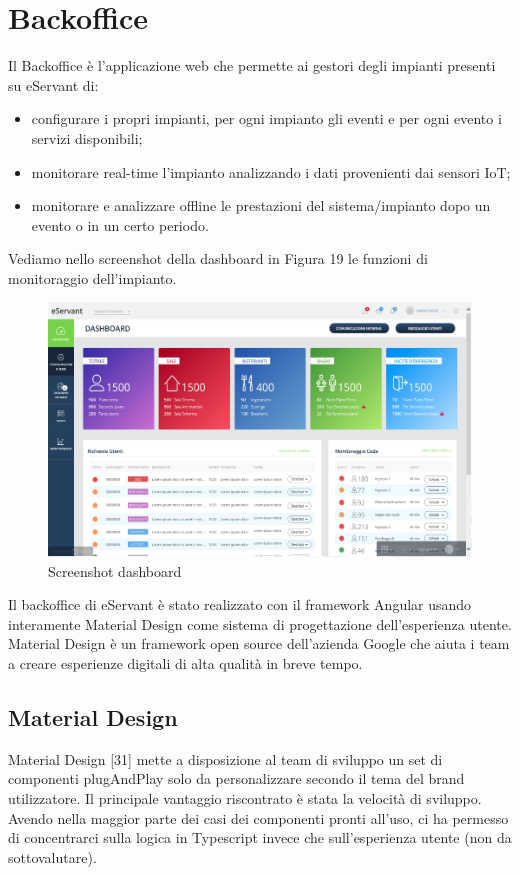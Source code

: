 \chapter{Backoffice}
Il Backoffice è l'applicazione web che permette ai gestori degli impianti presenti su eServant di:
\begin{itemize}
    \item configurare i propri impianti, per ogni impianto gli eventi e per ogni evento i servizi disponibili;
    \item monitorare real-time l'impianto analizzando i dati provenienti dai sensori IoT;
    \item monitorare e analizzare offline le prestazioni del sistema/impianto dopo un evento o in un certo periodo.
\end{itemize}
Vediamo nello screenshot della dashboard in Figura 19 le funzioni di monitoraggio dell'impianto.
\begin{figure}[H]
    \centering  
    \caption{Screenshot dashboard}
    \includegraphics[scale=0.4]{img/cap3/backoffice}
\end{figure}

Il backoffice di eServant è stato realizzato con il framework Angular usando interamente Material Design come
sistema di progettazione dell'esperienza utente.
Material Design è un framework open source dell'azienda Google che aiuta i team a creare esperienze digitali
di alta qualità in breve tempo.

\section{Material Design}
Material Design [31] mette a disposizione al team di sviluppo un set di componenti plugAndPlay solo da personalizzare
secondo il tema del brand utilizzatore.
Il principale vantaggio riscontrato è stata la velocità di sviluppo. Avendo nella maggior parte dei
casi dei componenti pronti all'uso, ci ha permesso di concentrarci sulla logica in Typescript invece che
sull'esperienza utente (non da sottovalutare).

